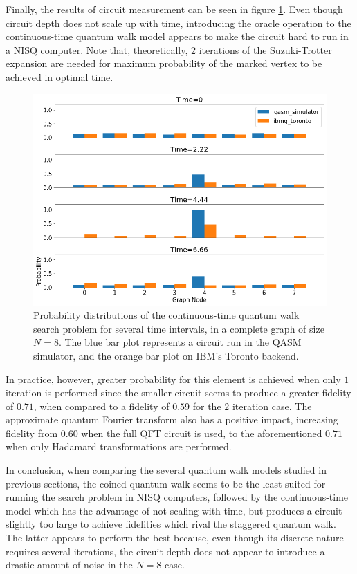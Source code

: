 \documentclass[../../dissertation.tex]{subfiles}
\begin{document}
Finally, the results of circuit measurement can be seen in figure
\ref{fig:contSearchResultCircQistkit}.  Even though circuit depth does not
scale up with time, introducing the oracle operation to the continuous-time
quantum walk model appears to make the circuit hard to run in a NISQ computer.
Note that, theoretically, $2$ iterations of the Suzuki-Trotter expansion are
needed for maximum probability of the marked vertex to be achieved in optimal
time. 
\begin{figure}[!h]
	\centering
	\includegraphics[scale=0.40]{img/Qiskit/ContQuantumWalk/Search/ContQW_N3_S2.png}
	\caption{Probability distributions of the continuous-time quantum walk search problem for several time intervals, in a complete graph of size $N=8$. The blue bar plot represents a circuit run in the QASM simulator, and the orange bar plot on IBM's Toronto backend.}
	\label{fig:contSearchResultCircQistkit}
\end{figure}
In practice, however, greater probability for this element is achieved when
only $1$ iteration is performed since the smaller circuit seems to produce a
greater fidelity of $0.71$, when compared to a fidelity of $0.59$ for the $2$
iteration case. The approximate quantum Fourier transform also has a positive
impact, increasing fidelity from $0.60$ when the full QFT circuit is used, to
the aforementioned $0.71$ when only Hadamard transformations are performed.\par
In conclusion, when comparing the several quantum walk models studied in
previous sections, the coined quantum walk seems to be the least suited for
running the search problem in NISQ computers, followed by the continuous-time
model which has the advantage of not scaling with time, but produces a circuit
slightly too large to achieve fidelities which rival the staggered quantum
walk. The latter appears to perform the best because, even though its discrete
nature requires several iterations, the circuit depth does not appear to
introduce a drastic amount of noise in the $N=8$ case. 
\end{document}
